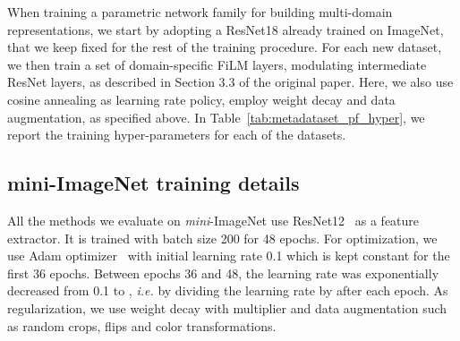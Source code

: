 \documentclass[runningheads]{llncs}
\newcommand\bb[1]{\textbf{#1}}
\begin{document}
When training a parametric network family for building multi-domain
representations, we start by adopting a ResNet18 already trained on ImageNet,
that we keep fixed for the rest of the training procedure. For each new dataset,
we then train a set of domain-specific FiLM layers, modulating intermediate
ResNet layers, as described in Section 3.3
of the original paper. Here, we also use cosine annealing as learning rate
policy, employ weight decay and data augmentation, as specified above. In
Table~\ref{tab:metadataset_pf_hyper}, we report the training hyper-parameters
for each of the datasets.

\subsection{mini-ImageNet training details}
All the methods we evaluate on \textit{mini}-ImageNet use
ResNet12~\cite{oreshkin2018tadam} as a feature extractor. It is trained with
batch size 200 for 48 epochs. For optimization, we use Adam
optimizer~\cite{adam} with initial learning rate 0.1 which is kept constant for
the first 36 epochs. Between epochs 36 and 48, the learning rate was
exponentially decreased from 0.1 to , \textit{i.e.} by dividing the learning rate by
 after each epoch. As regularization, we use weight decay with
 multiplier and data augmentation such as random crops, flips
and color transformations.


\begin{table}[t!] 
\begin{center}
\small\addtolength{\tabcolsep}{-10pt}
\renewcommand{\arraystretch}{1.0}
\renewcommand{\tabcolsep}{1.6mm}
\end{center}
\caption{\bb{Training hyper-parameters of individual feature networks on MetaDataset}. The first column
  indicates the dataset used for training. The first row gives the name of he
  hyper-parameter. The body of the table contains hyper-parameters that produced
  the most accurate model on the validation set.}
\label{tab:metadataset_hyper}
\end{table}
\end{document}
